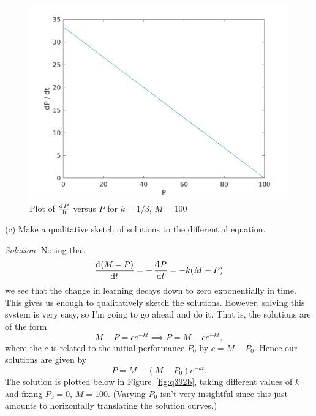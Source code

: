 \documentclass{article}
\begin{document}
\begin{figure}[!ht]
    \includegraphics[width=5in]{q392a}
    \centering
    \caption{Plot of $\od{P}{t}$ versus $P$ for $k = 1/3$, $M = 100$}
    \label{fig:q392a}
\end{figure}

\vspace{5mm}

(c) Make a qualitative sketch of solutions to the differential equation.

\textit{Solution.}
Noting that
%
\begin{equation*}
    \dod{(M - P)}{t} = - \dod{P}{t} = - k (M - P)
\end{equation*}
%
we see that the change in learning decays down to zero exponentially in time.
This gives us enough to qualitatively sketch the solutions. However,
solving this system is very easy, so I'm going to go ahead and do it.
That is, the solutions are of the form
%
\begin{equation*}
    M - P = c e^{-k t} \implies P = M - c e^{-k t},
\end{equation*}
%
where the $c$ is related to the initial performance $P_0$ by
$c = M - P_0$. Hence our solutions are given by
%
\begin{equation*}
    P = M - (M - P_0) e^{-k t}
    .
\end{equation*}
%
The solution is plotted below in Figure~\ref{fig:q392b}, taking
different values of $k$ and fixing $P_0 = 0$, $M = 100$. (Varying $P_0$
isn't very insightful since this just amounts to horizontally
translating the solution curves.)
\end{document}
